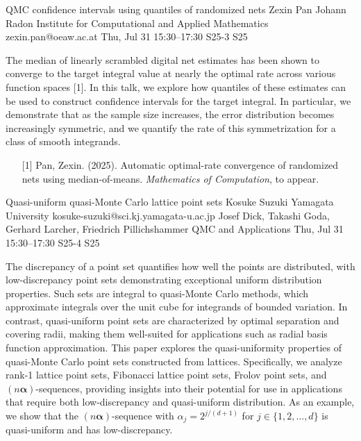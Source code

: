 \begin{talk}
  {QMC confidence intervals using quantiles of randomized nets}%
  {Zexin Pan}%
  {Johann Radon Institute for Computational and Applied Mathematics}%
  {zexin.pan@oeaw.ac.at}%
  {}%
  {}%
  {Thu, Jul 31 15:30–17:30}%
  {S25-3}%
  {S25}%
  {}%
  
				


The median of linearly scrambled digital net estimates has been shown to converge to the target integral value at nearly the optimal rate across various function spaces [1]. In this talk, we explore how quantiles of these estimates can be used to construct confidence intervals for the target integral. In particular, we demonstrate that as the sample size increases, the error distribution becomes increasingly symmetric, and we quantify the rate of this symmetrization for a class of smooth integrands.
            
\medskip


\begin{enumerate}
	\item[{[1]}] Pan, Zexin. (2025). Automatic optimal-rate convergence of randomized nets using median-of-means. {\it  Mathematics of Computation}, to appear.
\end{enumerate}

\end{talk}

\begin{talk}
  {Quasi-uniform quasi-Monte Carlo lattice point sets}%
  {Kosuke Suzuki}%
  {Yamagata University}%
  {kosuke-suzuki@sci.kj.yamagata-u.ac.jp}%
  {Josef Dick, Takashi Goda, Gerhard Larcher, Friedrich Pillichshammer}%
  {QMC and Applications}%
  {Thu, Jul 31 15:30–17:30}%
  {S25-4}%
  {S25}%
				
			

The discrepancy of a point set quantifies how well the points are distributed, with low-discrepancy point sets demonstrating exceptional uniform distribution properties. Such sets are integral to quasi-Monte Carlo methods, which approximate integrals over the unit cube for integrands of bounded variation. In contrast, quasi-uniform point sets are characterized by optimal separation and covering radii, making them well-suited for applications such as radial basis function approximation. This paper explores the quasi-uniformity properties of quasi-Monte Carlo point sets constructed from lattices. Specifically, we analyze rank-1 lattice point sets, Fibonacci lattice point sets, Frolov point sets, and $(n \boldsymbol{\alpha})$-sequences, providing insights into their potential for use in applications that require both low-discrepancy and quasi-uniform distribution. As an example, we show that the $(n \boldsymbol{\alpha})$-sequence with $\alpha_j = 2^{j/(d+1)}$ for $j \in \{1, 2, \ldots, d\}$ is quasi-uniform and has low-discrepancy.


\end{talk}

